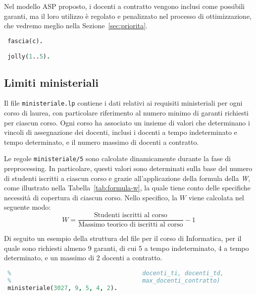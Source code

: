 Nel modello ASP proposto, i docenti a contratto vengono inclusi come possibili garanti, 
ma il loro utilizzo è regolato e penalizzato nel processo di ottimizzazione, che vedremo
meglio nella Sezione~\ref{sec:priorita}. 

\begin{lstlisting}[language=prolog, caption={Esempio struttura dati di \texttt{docenti\_a\_contratto.lp}.}]
 %  SEZIONE: FASCIE
 fascia(c).

 jolly(1..5).
\end{lstlisting}


\subsection{Limiti ministeriali}\label{sec:rules-ministeriale}

Il file \texttt{ministeriale.lp} contiene i dati relativi ai requisiti ministeriali per 
ogni corso di laurea, con particolare riferimento al numero minimo di garanti richiesti 
per ciascun corso. Ogni corso ha associato un insieme di valori che determinano i vincoli 
di assegnazione dei docenti, inclusi i docenti a tempo indeterminato e tempo determinato,
e il numero massimo di docenti a contratto.

Le regole \texttt{ministeriale/5} sono calcolate dinamicamente durante la fase di 
preprocessing. In particolare, questi valori sono determinati sulla base del numero di 
studenti iscritti a ciascun corso e grazie all'applicazione della formula della \textit{W}, 
come illustrato nella Tabella~\ref{tab:formula-w}, la quale tiene conto delle specifiche 
necessità di copertura di ciascun corso. Nello specifico, la $W$ viene calcolata nel 
seguente modo:
$$
W = \frac{
        \text{Studenti iscritti al corso}
    }
    {
        \text{Massimo teorico di iscritti al corso}
    }
    - 1
$$

Di seguito un esempio della struttura del file per il corso di Informatica, per 
il quale sono richiesti almeno 9 garanti, di cui 5 a tempo indeterminato, 4 a tempo 
determinato, e un massimo di 2 docenti a contratto. 

\begin{lstlisting}[language=prolog, caption={Esempio struttura dati di \texttt{ministeriale.lp}.}]    
 %  SEZIONE: Garanti minimi per corso (codice_corso, minimo_complessivo, 
 %                                     docenti_ti, docenti_td, 
 %                                     max_docenti_contratto)
 ministeriale(3027, 9, 5, 4, 2).
\end{lstlisting} 

